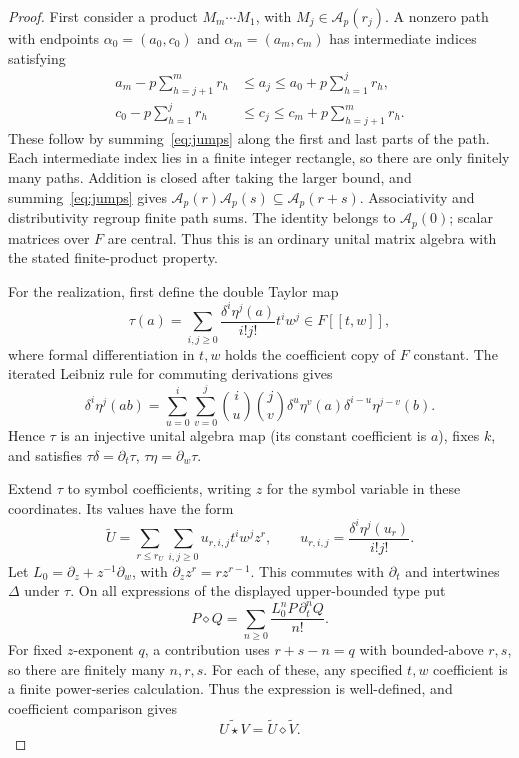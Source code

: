 \documentclass{article}
\newcommand{\Af}{\mathcal A}
\begin{document}
\begin{proof}
First consider a product $M_m\cdots M_1$, with $M_j\in\Af_p(r_j)$. A nonzero path with endpoints $\alpha_0=(a_0,c_0)$ and $\alpha_m=(a_m,c_m)$ has intermediate indices satisfying
\begin{align}
 a_m-p\sum_{h=j+1}^m r_h&\leq a_j\leq a_0+p\sum_{h=1}^j r_h,\tag{6.2}\label{eq:patha}\\
 c_0-p\sum_{h=1}^j r_h&\leq c_j\leq c_m+p\sum_{h=j+1}^m r_h.\tag{6.3}\label{eq:pathc}
\end{align}
These follow by summing~\eqref{eq:jumps} along the first and last parts of the path. Each intermediate index lies in a finite integer rectangle, so there are only finitely many paths. Addition is closed after taking the larger bound, and summing~\eqref{eq:jumps} gives $\Af_p(r)\Af_p(s)\subseteq\Af_p(r+s)$. Associativity and distributivity regroup finite path sums. The identity belongs to $\Af_p(0)$; scalar matrices over $F$ are central. Thus this is an ordinary unital matrix algebra with the stated finite-product property.

For the realization, first define the double Taylor map
\[
 \tau(a)=\sum_{i,j\geq0}\frac{\delta^i\eta^j(a)}{i!j!}t^iw^j\in F[[t,w]],
 \tag{6.4}\label{eq:taylor}
\]
where formal differentiation in $t,w$ holds the coefficient copy of $F$ constant. The iterated Leibniz rule for commuting derivations gives
\[
 \delta^i\eta^j(ab)=\sum_{u=0}^i\sum_{v=0}^j
 \binom iu\binom jv\delta^u\eta^v(a)\delta^{i-u}\eta^{j-v}(b).
\]
Hence $\tau$ is an injective unital algebra map (its constant coefficient is $a$), fixes $k$, and satisfies $\tau\delta=\partial_t\tau$, $\tau\eta=\partial_w\tau$.

Extend $\tau$ to symbol coefficients, writing $z$ for the symbol variable in these coordinates. Its values have the form
\[
 \widetilde U=\sum_{r\leq r_U}\sum_{i,j\geq0}u_{r,i,j}t^iw^jz^r,
 \qquad u_{r,i,j}=\frac{\delta^i\eta^j(u_r)}{i!j!}.
\]
Let $L_0=\partial_z+z^{-1}\partial_w$, with $\partial_z z^r=rz^{r-1}$. This commutes with $\partial_t$ and intertwines $\Delta$ under $\tau$. On all expressions of the displayed upper-bounded type put
\[
 P\diamond Q=\sum_{n\geq0}\frac{L_0^nP\,\partial_t^nQ}{n!}.
 \tag{6.5}\label{eq:diamond}
\]
For fixed $z$-exponent $q$, a contribution uses $r+s-n=q$ with bounded-above $r,s$, so there are finitely many $n,r,s$. For each of these, any specified $t,w$ coefficient is a finite power-series calculation. Thus the expression is well-defined, and coefficient comparison gives
\[
 \widetilde{U\star V}=\widetilde U\diamond\widetilde V.
 \tag{6.6}\label{eq:intertwine}
\]


\end{proof}
\end{document}
